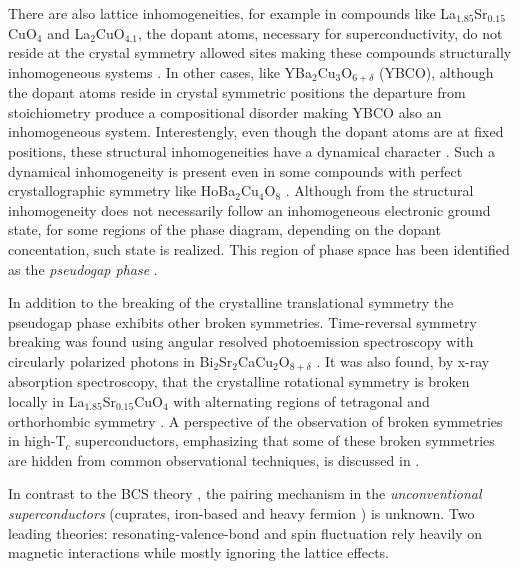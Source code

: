 There are also lattice inhomogeneities, for example in compounds like La$_{1.85}$Sr$_{0.15}$CuO$_{4}$ and La$_{2}$CuO$_{4.1}$, the dopant atoms, necessary for superconductivity, do not reside at the crystal symmetry allowed sites making these compounds structurally inhomogeneous systems \cite{Poccia2011}.
In other cases, like YBa$_2$Cu$_3$O$_{6+\delta}$ (YBCO), although the dopant atoms reside in crystal symmetric positions the departure from stoichiometry produce a compositional disorder \cite{Chen1988,Andersen1990} making YBCO also an inhomogeneous system.
Interestengly, even though the dopant atoms are at fixed positions, these structural inhomogeneities have a dynamical character \cite{Mihailovic2005,Bianconi1996}.
Such a dynamical inhomogeneity is present even in some compounds with perfect crystallographic symmetry like HoBa$_{2}$Cu$_{4}$O$_{8}$ \cite{RubioTemprano2000}.
Although from the structural inhomogeneity does not necessarily follow an inhomogeneous electronic ground state, for some regions of the phase diagram, depending on the dopant concentation, such state is realized.
This region of phase space has been identified as the \textit{pseudogap phase} \cite{Kresin2009,Muller2007,Timusk1999}.

In addition to the breaking of the crystalline translational symmetry the pseudogap phase exhibits other broken symmetries. 
Time-reversal symmetry breaking was found using angular resolved photoemission spectroscopy with circularly polarized photons in Bi$_{2}$Sr$_{2}$CaCu$_{2}$O$_{8+\delta}$ \cite{Kaminski2002}.
It was also found, by x-ray absorption spectroscopy, that the crystalline rotational symmetry is broken locally in La$_{1.85}$Sr$_{0.15}$CuO$_{4}$ with alternating regions of tetragonal and orthorhombic symmetry \cite{Bianconi1996}.
A perspective of the observation of broken symmetries in high-T$_{c}$ superconductors, emphasizing that some of these broken symmetries are hidden from common observational techniques, is discussed in \cite{Chakravarty2011}.

\cite{Chakravarty2008}



In contrast to the BCS theory \cite{Bardeen1957}, the pairing mechanism in the \textit{unconventional superconductors} (cuprates, iron-based and heavy fermion \cite{Pfleiderer2009}) is unknown.
Two leading theories: resonating-valence-bond \cite{?} and spin fluctuation \cite{Scalapino2012} rely heavily on magnetic interactions while mostly ignoring the lattice effects.


